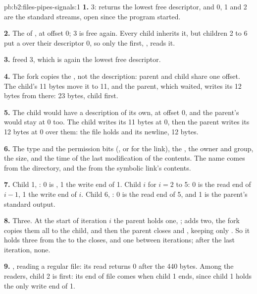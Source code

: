 \begin{solution}{pb:b2:files-pipes-signals:1}
\textbf{1.} 3:  returns the lowest free descriptor, and 0, 1 and 2 are the standard streams, open since
the program started.

\textbf{2.} The  of , at offset 0; 3 is free again. Every child inherits it,
but children 2 to 6 put a  over their descriptor 0, so only the first, , reads it.

\textbf{3.}  freed 3, which is again the lowest free descriptor.

\textbf{4.} The fork copies the , not the description: parent and child share one offset. The child's
11 bytes move it to 11, and the parent, which waited, writes its 12 bytes from there: 23 bytes, child first.

\textbf{5.} The child would have a description of its own, at offset 0, and the parent's would stay at 0 too. The
child writes its 11 bytes at 0, then the parent writes its 12 bytes at 0 over them: the file holds
 and its newline, 12 bytes.

\textbf{6.} The type and the permission bits (, or  for the link), the , the owner
and group, the size, and the time of the last modification of the contents. The name comes from the directory, and the
 from the symbolic link's contents.

\textbf{7.} Child 1, : 0 is , 1 the write end of  1. Child $i$ for $i = 2$ to 5: 0
is the read end of  $i - 1$, 1 the write end of  $i$. Child 6, : 0 is the read end of  5, and 1
is the parent's standard output.

\textbf{8.} Three. At the start of iteration $i$ the parent holds one, ;  adds two, the fork
copies them all to the child, and then the parent closes  and , keeping only .
So it holds three from the  to the closes, and one between iterations; after the last iteration, none.

\textbf{9.} , reading a regular file: its read returns 0 after the 440 bytes. Among the  readers,
child 2 is first: its end of file comes when child 1 ends, since child 1 holds the only write end of  1.


\end{solution}
